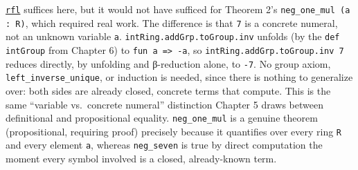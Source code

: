 \href{https://lean-lang.org/doc/reference/latest/Tactic-Proofs/Tactic-Reference/}{\texttt{rfl}} suffices here, but it would not have sufficed for Theorem 2's \texttt{neg\_\allowbreak{}one\_\allowbreak{}mul (a : R)}, which required real work. The difference is that \texttt{7} is a concrete numeral, not an unknown variable \texttt{a}. \texttt{intRing.addGrp.toGroup.inv} unfolds (by the \texttt{def intGroup} from Chapter 6) to \texttt{fun a => -\allowbreak{}a}, so \texttt{intRing.addGrp.toGroup.inv 7} reduces directly, by unfolding and β-reduction alone, to \texttt{-\allowbreak{}7}. No group axiom, \texttt{left\_\allowbreak{}inverse\_\allowbreak{}unique}, or induction is needed, since there is nothing to generalize over: both sides are already closed, concrete terms that compute. This is the same ``variable vs.~concrete numeral'' distinction Chapter 5 draws between definitional and propositional equality. \texttt{neg\_\allowbreak{}one\_\allowbreak{}mul} is a genuine theorem (propositional, requiring proof) precisely because it quantifies over every ring \texttt{R} and every element \texttt{a}, whereas \texttt{neg\_\allowbreak{}seven} is true by direct computation the moment every symbol involved is a closed, already-known term.
